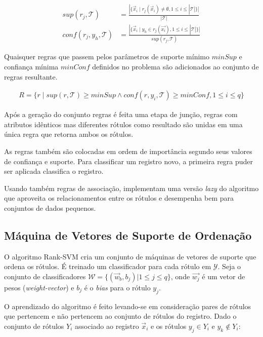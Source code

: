 \documentclass[runningheads,a4paper]{llncs}
\begin{document}
\begin{align*}
	sup(r_j, \mathcal{T}) &= \frac{|\{ \vec{x}_i \mid r_j(\vec{x}_i) \neq \emptyset, 1 \leq i \leq |\mathcal{T}| \}|}{|\mathcal{T}|} \\
	conf(r_j, y_h, \mathcal{T}) &= \frac{|\{ \vec{x}_i \mid y_h \in r_j(\vec{x_i}), 1 \leq i \leq |\mathcal{T}| \}|}{sup(r_j, \mathcal{T})} 
\end{align*}

Quaisquer regras que passem pelos parâmetros de suporte mínimo $minSup$ e confiança mínima $minConf$ definidos no problema são adicionados ao conjunto de regras resultante.

\begin{align*}
	R = \{ r \mid sup(r, \mathcal{T}) \geq minSup \wedge conf(r, y_i, \mathcal{T}) \geq minConf, 1 \leq i \leq q \}
\end{align*}

Após a geração do conjunto regras é feita uma etapa de junção, regras com atributos idênticos mas diferentes rótulos como resultado são unidas em uma única regra que retorna ambos os rótulos.

As regras também são colocadas em ordem de importância segundo seus valores de confiança e suporte. Para classificar um registro novo, a primeira regra puder ser aplicada classifica o registro.

Usando também regras de associação, \cite{Veloso2007-el} implementam uma versão \textit{lazy} do algoritmo que aproveita os relacionamentos entre os rótulos e desempenha bem para conjuntos de dados pequenos.


\subsection{Máquina de Vetores de Suporte de Ordenação}

O algoritmo Rank-SVM \cite{Elisseeff2001-lp} cria um conjunto de máquinas de vetores de suporte que ordena os rótulos. É treinado um classificador para cada rótulo em $\mathcal{Y}$. Seja o conjunto de classificadores $\mathcal{W} = \{ (\vec{w}_b, b_j) | 1 \leq j \leq q \}$, onde $\vec{w_j}$ é um vetor de pesos (\textit{weight-vector}) e $b_j$ é o \textit{bias} para o rótulo $y_j$.

O aprendizado do algoritmo é feito levando-se em consideração pares de rótulos que pertencem e não pertencem ao conjunto de rótulos do registro. Dado o conjunto de rótulos $Y_i$ associado ao registro $\vec{x}_i$ e os rótulos $y_j \in Y_i$ e $y_k \notin Y_i$:
\end{document}
